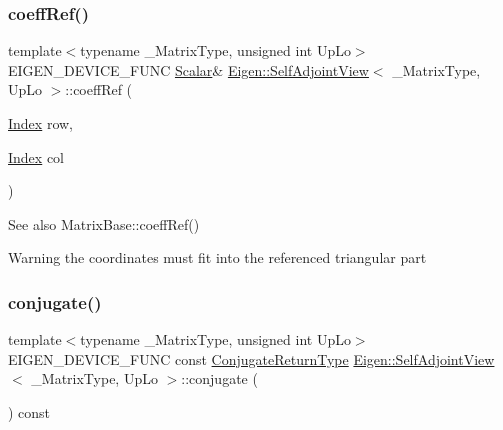 \subsubsection{\texorpdfstring{coeffRef()}{coeffRef()}}
{\footnotesize\ttfamily template$<$typename \+\_\+\+Matrix\+Type, unsigned int Up\+Lo$>$ \\
E\+I\+G\+E\+N\+\_\+\+D\+E\+V\+I\+C\+E\+\_\+\+F\+U\+NC \mbox{\hyperlink{class_eigen_1_1_self_adjoint_view_af52acc0942ece2de9b6db4a99cc6656e}{Scalar}}\& \mbox{\hyperlink{class_eigen_1_1_self_adjoint_view}{Eigen\+::\+Self\+Adjoint\+View}}$<$ \+\_\+\+Matrix\+Type, Up\+Lo $>$\+::coeff\+Ref (\begin{DoxyParamCaption}\item[{\mbox{\hyperlink{struct_eigen_1_1_eigen_base_a554f30542cc2316add4b1ea0a492ff02}{Index}}}]{row,  }\item[{\mbox{\hyperlink{struct_eigen_1_1_eigen_base_a554f30542cc2316add4b1ea0a492ff02}{Index}}}]{col }\end{DoxyParamCaption})\hspace{0.3cm}{\ttfamily [inline]}}

\begin{DoxySeeAlso}{See also}
Matrix\+Base\+::coeff\+Ref() 
\end{DoxySeeAlso}
\begin{DoxyWarning}{Warning}
the coordinates must fit into the referenced triangular part 
\end{DoxyWarning}
\mbox{\label{class_eigen_1_1_self_adjoint_view_aee8afbae3643e8af7cdfb5791404fc22}} 
\subsubsection{\texorpdfstring{conjugate()}{conjugate()}}
{\footnotesize\ttfamily template$<$typename \+\_\+\+Matrix\+Type, unsigned int Up\+Lo$>$ \\
E\+I\+G\+E\+N\+\_\+\+D\+E\+V\+I\+C\+E\+\_\+\+F\+U\+NC const \mbox{\hyperlink{class_eigen_1_1_self_adjoint_view}{Conjugate\+Return\+Type}} \mbox{\hyperlink{class_eigen_1_1_self_adjoint_view}{Eigen\+::\+Self\+Adjoint\+View}}$<$ \+\_\+\+Matrix\+Type, Up\+Lo $>$\+::conjugate (\begin{DoxyParamCaption}{ }\end{DoxyParamCaption}) const\hspace{0.3cm}{\ttfamily [inline]}}

